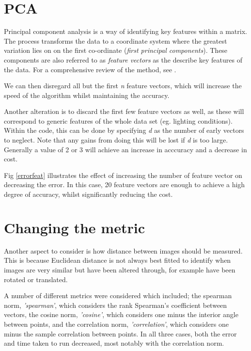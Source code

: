 \documentclass[12pt]{article}
\begin{document}
\section{PCA}

Principal component analysis is a way of identifying key features within a matrix. The process transforms the data to a coordinate system where the greatest variation lies on on the first co-ordinate (\emph{first principal components}). These components are also referred to as \emph{feature vectors} as the describe key features of the data. For a comprehensive review of the method, see \citep{PCA}.

We can then disregard all but the first \emph{n} feature vectors, which will increase the speed of the algorithm whilst maintaining the accuracy. 

Another alteration is to discard the first few feature vectors as well, as these will correspond to generic features of the whole data set (eg. lighting conditions). Within the code, this can be done by specifying \emph{d} as the number of early vectors to neglect. Note that any gains from doing this will be lost if \emph{d} is too large. Generally a value of 2 or 3 will achieve an increase in acccuracy and a decrease in cost. 

Fig \ref{errorfeat} illustrates the effect of increasing the number of feature vector on decreasing the error. In this case, 20 feature vectors are enough to achieve a high degree of accuracy, whilst significantly reducing the cost. 

\section{Changing the metric}

Another aspect to consider is how distance between images should be measured. This is because Euclidean distance is not always best fitted to identify when images are very similar but have been altered through, for example have been rotated or translated.

A number of different metrics were considered which included; the spearman norm, \emph{'spearman'}, which considers the rank Spearman's coefficient between vectors, the cosine norm, \emph{'cosine'}, which considers one minus the interior angle between points, and the correlation norm, \emph{'correlation'}, which considers one minus the sample correlation between points. In all three cases, both the error and time taken to run decreased, most notably with the correlation norm.
\end{document}
